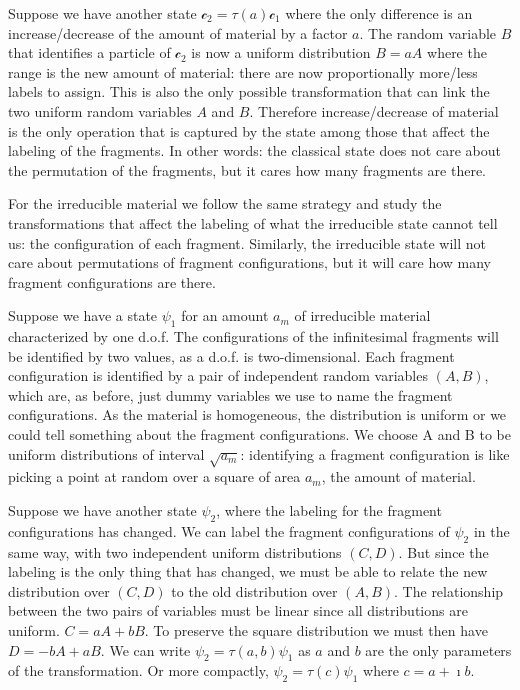 \documentclass[aps,pra,10pt,twocolumn,floatfix,nofootinbib]{revtex4-1}
\numberwithin{equation}{section}
\theoremstyle{definition}
\begin{document}
Suppose we have another state $\mathcal{c}_2 = \tau(a) \mathcal{c}_1$ where the only difference is an increase/decrease of the amount of material by a factor $a$. The random variable $B$ that identifies a particle of $\mathcal{c}_2$ is now a uniform distribution $B=aA$ where the range is the new amount of material: there are now proportionally more/less labels to assign. This is also the only possible transformation that can link the two uniform random variables $A$ and $B$. Therefore increase/decrease of material is the only operation that is captured by the state among those that affect the labeling of the fragments. In other words: the classical state does not care about the permutation of the fragments, but it cares how many fragments are there.

For the irreducible material we follow the same strategy and study the transformations that affect the labeling of what the irreducible state cannot tell us: the configuration of each fragment. Similarly, the irreducible state will not care about permutations of fragment configurations, but it will care how many fragment configurations are there.

Suppose we have a state $\psi_1$ for an amount $a_m$ of irreducible material characterized by one d.o.f. The configurations of the infinitesimal fragments will be identified by two values, as a d.o.f. is two-dimensional. Each fragment configuration is identified by a pair of independent random variables $(A, B)$, which are, as before, just dummy variables we use to name the fragment configurations. As the material is homogeneous, the distribution is uniform or we could tell something about the fragment configurations. We choose A and B to be uniform distributions of interval $\sqrt{a_m}$: identifying a fragment configuration is like picking a point at random over a square of area $a_m$, the amount of material.

Suppose we have another state $\psi_2$, where the labeling for the fragment configurations has changed. We can label the fragment configurations of $\psi_2$ in the same way, with two independent uniform distributions $(C, D)$. But since the labeling is the only thing that has changed, we must be able to relate the new distribution over $(C,D)$ to the old distribution over $(A,B)$. The relationship between the two pairs of variables must be linear since all distributions are uniform. $C=aA+bB$. To preserve the square distribution we must then have $D= -bA + aB$. We can write $\psi_2 = \tau(a,b) \psi_1$ as $a$ and $b$ are the only parameters of the transformation. Or more compactly, $\psi_2 = \tau(c) \psi_1$ where $c=a+\imath b$.
\end{document}

